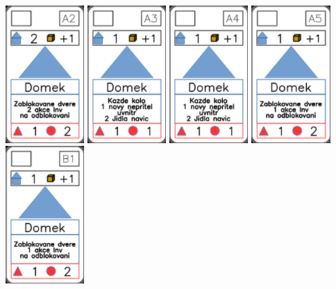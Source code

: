 \documentclass[a4paper]{article}
\begin{document}
	\includegraphics[width=3.0cm]{img-3_1}
	\includegraphics[width=3.0cm]{img-3_2}
	\includegraphics[width=3.0cm]{img-3_3}
	\includegraphics[width=3.0cm]{img-3_4}
	\includegraphics[width=3.0cm]{img-3_5}
\end{document}
